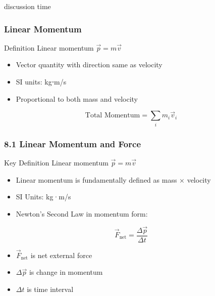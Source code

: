 \documentclass{beamer}
\begin{document}
\begin{frame}{discussion time}
    
\end{frame}

\begin{frame}
\frametitle{Linear Momentum}
\begin{block}{Definition}
Linear momentum $\vec{p} = m\vec{v}$
\end{block}
\begin{itemize}
\item Vector quantity with direction same as velocity
\item SI units: kg⋅m/s
\item Proportional to both mass and velocity
\end{itemize}
\begin{equation*}
\text{Total Momentum} = \sum_i m_i\vec{v}_i
\end{equation*}
\end{frame}



\begin{frame}
\frametitle{8.1 Linear Momentum and Force}
\begin{block}{Key Definition}
Linear momentum $\vec{p} = m\vec{v}$
\end{block}

\begin{itemize}
\item Linear momentum is fundamentally defined as mass × velocity
\item SI Units: kg·m/s
\item Newton's Second Law in momentum form:
\end{itemize}

\begin{equation*}
\vec{F}_{\text{net}} = \frac{\Delta \vec{p}}{\Delta t}
\end{equation*}

\begin{itemize}
\item $\vec{F}_{\text{net}}$ is net external force
\item $\Delta \vec{p}$ is change in momentum
\item $\Delta t$ is time interval
\end{itemize}
\end{frame}
\end{document}
